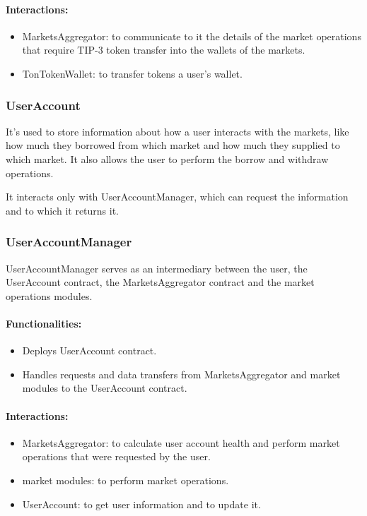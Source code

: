 \paragraph*{Interactions:}
\begin{itemize}
  \item MarketsAggregator: to communicate to it the details of the market operations that require TIP-3 token transfer into the wallets of the markets.
  \item TonTokenWallet: to transfer tokens a user's wallet.
\end{itemize}

\subsubsection{UserAccount}

It's used to store information about how a user interacts with the markets, like how much they borrowed from which market and how much they supplied to which market. It also allows the user to perform the borrow and withdraw operations.

It interacts only with UserAccountManager, which can request the information and to which it returns it.

\subsubsection{UserAccountManager}

UserAccountManager serves as an intermediary between the user, the UserAccount contract, the MarketsAggregator contract and the market operations modules.

\paragraph*{Functionalities:}
\begin{itemize}
  \item Deploys UserAccount contract.
  \item Handles requests and data transfers from MarketsAggregator and market modules to the UserAccount contract.
\end{itemize}

\paragraph*{Interactions:}
\begin{itemize}
  \item MarketsAggregator: to calculate user account health and perform market operations that were requested by the user.
  \item market modules: to perform market operations.
  \item UserAccount: to get user information and to update it.
\end{itemize}

